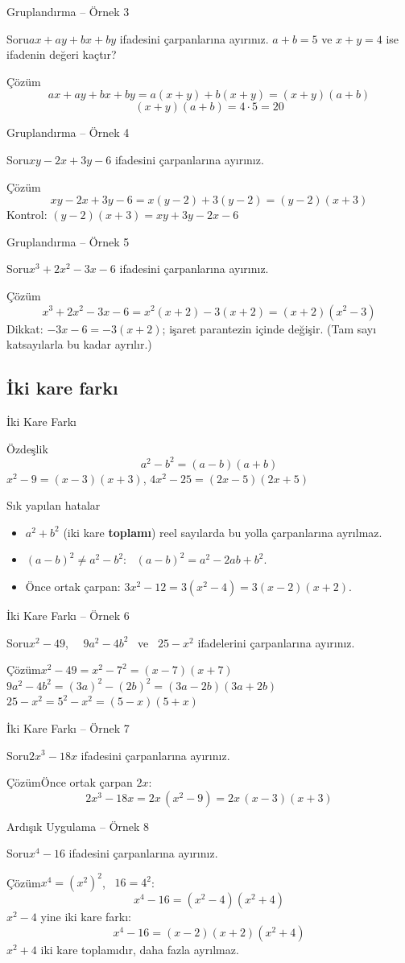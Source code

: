 \documentclass[aspectratio=169,11pt]{beamer}
\newcommand{\soru}[3]{%
\begin{frame}{#1}
  \begin{block}{Soru}\large #2\end{block}
  \pause
  \begin{exampleblock}{Çözüm}\large #3\end{exampleblock}
\end{frame}}
\begin{document}
\soru{Gruplandırma -- Örnek 3}
{\(ax+ay+bx+by\) ifadesini çarpanlarına ayırınız. \(a+b=5\) ve \(x+y=4\) ise ifadenin değeri kaçtır?}
{\[ax+ay+bx+by=a(x+y)+b(x+y)=(x+y)(a+b)\]
\[(x+y)(a+b)=4\cdot 5=20\]}

\soru{Gruplandırma -- Örnek 4}
{\(xy-2x+3y-6\) ifadesini çarpanlarına ayırınız.}
{\[xy-2x+3y-6=x(y-2)+3(y-2)=(y-2)(x+3)\]
Kontrol: \((y-2)(x+3)=xy+3y-2x-6\) \checkmark}

\soru{Gruplandırma -- Örnek 5}
{\(x^3+2x^2-3x-6\) ifadesini çarpanlarına ayırınız.}
{\[x^3+2x^2-3x-6=x^2(x+2)-3(x+2)=(x+2)(x^2-3)\]
Dikkat: \(-3x-6=-3(x+2)\); işaret parantezin içinde değişir. (Tam sayı katsayılarla bu kadar ayrılır.)}

\subsection{İki kare farkı}
\begin{frame}{İki Kare Farkı}
\begin{block}{Özdeşlik}
\[a^2-b^2=(a-b)(a+b)\]
\(x^2-9=(x-3)(x+3)\), \quad \(4x^2-25=(2x-5)(2x+5)\)
\end{block}
\begin{alertblock}{Sık yapılan hatalar}
\begin{itemize}
\item \(a^2+b^2\) (iki kare \textbf{toplamı}) reel sayılarda bu yolla çarpanlarına ayrılmaz.
\item \((a-b)^2\neq a^2-b^2\): \ \((a-b)^2=a^2-2ab+b^2\).
\item Önce ortak çarpan: \(3x^2-12=3(x^2-4)=3(x-2)(x+2)\).
\end{itemize}
\end{alertblock}
\end{frame}

\soru{İki Kare Farkı -- Örnek 6}
{\(x^2-49\), \ \ \(9a^2-4b^2\) \ ve \ \(25-x^2\) ifadelerini çarpanlarına ayırınız.}
{\(x^2-49=x^2-7^2=(x-7)(x+7)\)\\[3pt]
\(9a^2-4b^2=(3a)^2-(2b)^2=(3a-2b)(3a+2b)\)\\[3pt]
\(25-x^2=5^2-x^2=(5-x)(5+x)\)}

\soru{İki Kare Farkı -- Örnek 7}
{\(2x^3-18x\) ifadesini çarpanlarına ayırınız.}
{Önce ortak çarpan \(2x\):
\[2x^3-18x=2x\,(x^2-9)=2x\,(x-3)(x+3)\]}

\soru{Ardışık Uygulama -- Örnek 8}
{\(x^4-16\) ifadesini çarpanlarına ayırınız.}
{\(x^4=(x^2)^2\), \ \(16=4^2\):
\[x^4-16=(x^2-4)(x^2+4)\]
\(x^2-4\) yine iki kare farkı:
\[x^4-16=(x-2)(x+2)(x^2+4)\]
\(x^2+4\) iki kare toplamıdır, daha fazla ayrılmaz.}
\end{document}
